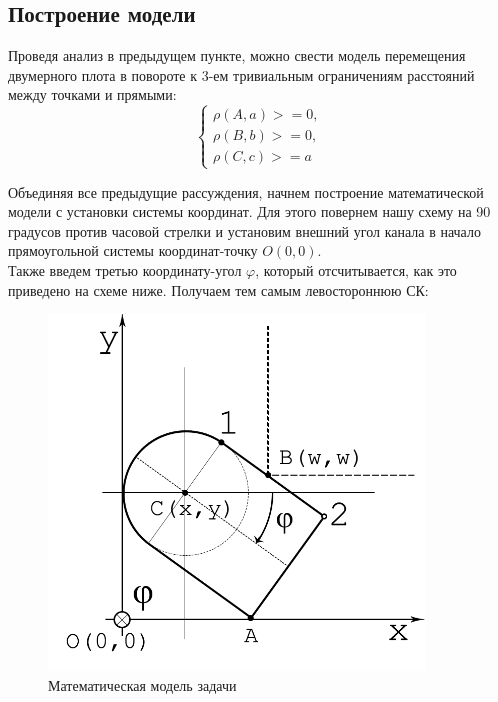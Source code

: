 \documentclass[12pt,a4paper]{article}
\begin{document}
		\subsection{Построение модели}
			Проведя анализ в предыдущем пункте, можно свести модель перемещения двумерного плота в повороте к 3-ем тривиальным ограничениям расстояний между точками и прямыми:
			\begin{equation}\label{eq:limitations}
				\left\{
					\begin{array}{ll}
						\rho(A, a) >= 0,\\
						\rho(B, b) >= 0,\\
						\rho(C, c) >= a
					\end{array}
				\right.
			\end{equation}
			
			Объединяя все предыдущие рассуждения, начнем построение математической модели с установки системы координат. Для этого повернем нашу схему на 90 градусов против часовой стрелки и установим внешний угол канала в начало прямоугольной системы координат-точку $O(0,0)$.\\
			
			Также введем третью координату-угол $\varphi$, который отсчитывается, как это приведено на схеме ниже. Получаем тем самым левостороннюю СК:
			\begin{figure}[H]\label{fig:model}
				\centering
				\includegraphics[width=10cm]{res/model.png}
				\caption{Математическая модель задачи}
			\end{figure}
			
\end{document}
